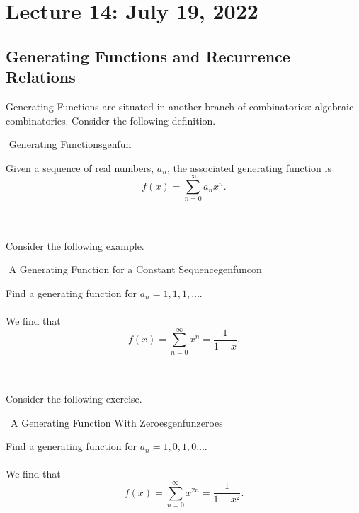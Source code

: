 \section{Lecture 14: July 19, 2022}

    \subsection{Generating Functions and Recurrence Relations}
    
        Generating Functions are situated in another branch of combinatorics: algebraic combinatorics. Consider the following definition.
        \begin{definition}{\Stop\,\,Generating Functions}{genfun}
        
            Given a sequence of real numbers, \(a_n\), the associated generating function is 
            \begin{equation*}
                f(x)=\sum_{n=0}^\infty a_nx^n.
            \end{equation*}
        
        \end{definition}
        \vphantom
        \\
        \\
        Consider the following example.
        \begin{example}{\Difficulty\,\,A Generating Function for a Constant Sequence}{genfuncon}
        
            Find a generating function for \(a_n=1,1,1,\ldots\).
            \\
            \\
            We find that
            \begin{equation*}
                f(x)=\sum_{n=0}^\infty x^n=\frac{1}{1-x}.
            \end{equation*}
        
        \end{example}
        \pagebreak
        \vphantom
        \\
        \\
        Consider the following exercise.
        \begin{exercise}{\Difficulty\,\Difficulty\,\,A Generating Function With Zeroes}{genfunzeroes}
        
            Find a generating function for \(a_n=1,0,1,0\ldots\).
            \\
            \\
            We find that
            \begin{equation*}
                f(x)=\sum_{n=0}^\infty x^{2n}=\frac{1}{1-x^2}.
            \end{equation*}
        
        \end{exercise}
